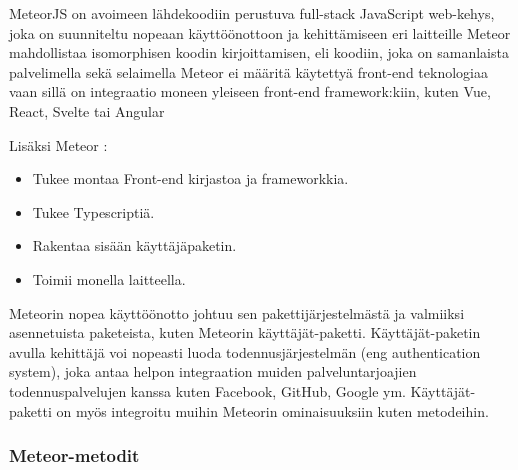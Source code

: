 









MeteorJS on avoimeen lähdekoodiin perustuva full-stack JavaScript web-kehys, joka on 
suunniteltu nopeaan käyttöönottoon ja kehittämiseen eri laitteille
Meteor mahdollistaa isomorphisen koodin kirjoittamisen, eli koodiin, joka on samanlaista palvelimella sekä selaimella %
Meteor ei määritä käytettyä front-end teknologiaa vaan sillä on integraatio moneen yleiseen front-end framework:kiin, kuten Vue, React, Svelte tai Angular
\medskip



    

Lisäksi Meteor :
\begin{itemize}
    \item Tukee montaa Front-end kirjastoa ja frameworkkia.
    \item Tukee Typescriptiä.
    \item Rakentaa sisään käyttäjäpaketin.
    \item Toimii monella laitteella.
\end{itemize}
\medskip


Meteorin nopea käyttöönotto johtuu sen pakettijärjestelmästä ja valmiiksi asennetuista paketeista, kuten Meteorin käyttäjät-paketti. 
Käyttäjät-paketin avulla kehittäjä voi nopeasti luoda todennusjärjestelmän (eng authentication system),
joka antaa helpon integraation muiden palveluntarjoajien todennuspalvelujen kanssa kuten Facebook, GitHub, Google ym.
Käyttäjät-paketti on myös integroitu muihin Meteorin ominaisuuksiin kuten metodeihin.



\subsubsection{Meteor-metodit}


